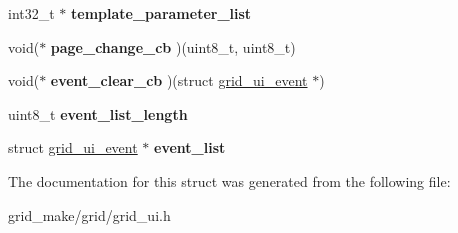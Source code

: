 \begin{DoxyCompactItemize}
\item 
\hypertarget{structgrid__ui__element_a8870e3fbec41254e548070953fe67172}{int32\-\_\-t $\ast$ {\bfseries template\-\_\-parameter\-\_\-list}}\label{structgrid__ui__element_a8870e3fbec41254e548070953fe67172}

\item 
\hypertarget{structgrid__ui__element_ae562c97b7935a2b963a90c123ff21344}{void($\ast$ {\bfseries page\-\_\-change\-\_\-cb} )(uint8\-\_\-t, uint8\-\_\-t)}\label{structgrid__ui__element_ae562c97b7935a2b963a90c123ff21344}

\item 
\hypertarget{structgrid__ui__element_abbc6de888d2b2f06107f1e600f7a5c4f}{void($\ast$ {\bfseries event\-\_\-clear\-\_\-cb} )(struct \hyperlink{structgrid__ui__event}{grid\-\_\-ui\-\_\-event} $\ast$)}\label{structgrid__ui__element_abbc6de888d2b2f06107f1e600f7a5c4f}

\item 
\hypertarget{structgrid__ui__element_a85360fa1f8dc2d9a04d383f9a21f193b}{uint8\-\_\-t {\bfseries event\-\_\-list\-\_\-length}}\label{structgrid__ui__element_a85360fa1f8dc2d9a04d383f9a21f193b}

\item 
\hypertarget{structgrid__ui__element_af5060f8ef54a851b680b8fc214f72f0d}{struct \hyperlink{structgrid__ui__event}{grid\-\_\-ui\-\_\-event} $\ast$ {\bfseries event\-\_\-list}}\label{structgrid__ui__element_af5060f8ef54a851b680b8fc214f72f0d}

\end{DoxyCompactItemize}


The documentation for this struct was generated from the following file\-:\begin{DoxyCompactItemize}
\item 
grid\-\_\-make/grid/grid\-\_\-ui.\-h\end{DoxyCompactItemize}
